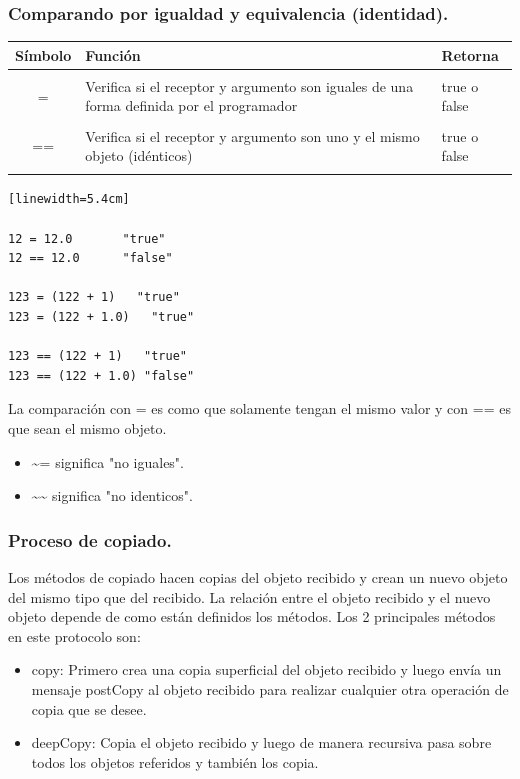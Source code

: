 \documentclass[10pt,journal,compsoc]{IEEEtran}
\begin{document}
\subsubsection{Comparando por igualdad y equivalencia (identidad).}
\begin{tabular}{c p{5cm} p{1cm}}
	S\'imbolo & Funci\'on & Retorna\\
	\hline\\
	= & Verifica si el receptor y argumento son iguales de una forma definida por el programador & true o false\\
	\hline\\
	== & Verifica si el receptor y argumento son uno y el mismo objeto (id\'enticos) & true o false\\
	\hline\\
\end{tabular}
\begin{lstlisting}[language=Smalltalk, caption = {Ejemplo de uso de los comparadores.}][linewidth=5.4cm]

12 = 12.0       "true"
12 == 12.0      "false"

123 = (122 + 1)   "true"
123 = (122 + 1.0)   "true"

123 == (122 + 1)   "true"
123 == (122 + 1.0) "false"

\end{lstlisting}
La comparaci\'on con = es como que solamente tengan el mismo valor y con == es que sean el mismo objeto.
\begin{itemize}
	\item \textasciitilde{}= significa "no iguales".
	\item \textasciitilde{}\textasciitilde{} significa "no identicos".
\end{itemize}
\subsubsection{Proceso de copiado.}
Los m\'etodos de copiado hacen copias del objeto recibido y crean un nuevo objeto del mismo tipo que del recibido. La relaci\'on entre el objeto recibido y el nuevo objeto depende de como est\'an definidos los m\'etodos. Los 2 principales m\'etodos en este protocolo son:
\begin{itemize}
	\item copy: Primero crea una copia superficial del objeto recibido y luego env\'ia un mensaje postCopy al objeto recibido para realizar cualquier otra operaci\'on de copia que se desee.
	\item deepCopy: Copia el objeto recibido y luego de manera recursiva pasa sobre todos los objetos referidos y tambi\'en los copia.
\end{itemize}
\end{document}
